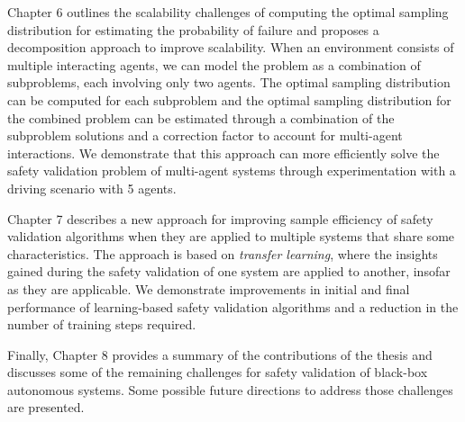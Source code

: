 Chapter 6 outlines the scalability challenges of computing the optimal sampling distribution for estimating the probability of failure and proposes a decomposition approach to improve scalability. When an environment consists of multiple interacting agents, we can model the problem as a combination of subproblems, each involving only two agents. The optimal sampling distribution can be computed for each subproblem and the optimal sampling distribution for the combined problem can be estimated through a combination of the subproblem solutions and a correction factor to account for multi-agent interactions. We demonstrate that this approach can more efficiently solve the safety validation problem of multi-agent systems through experimentation with a driving scenario with \num{5} agents. 

Chapter 7 describes a new approach for improving sample efficiency of safety validation algorithms when they are applied to multiple systems that share some characteristics. The approach is based on \emph{transfer learning}, where the insights gained during the safety validation of one system are applied to another, insofar as they are applicable. We demonstrate improvements in initial and final performance of learning-based safety validation algorithms and a reduction in the number of training steps required.

Finally, Chapter 8 provides a summary of the contributions of the thesis and discusses some of the remaining challenges for safety validation of black-box autonomous systems. Some possible future directions to address those challenges are presented. 
